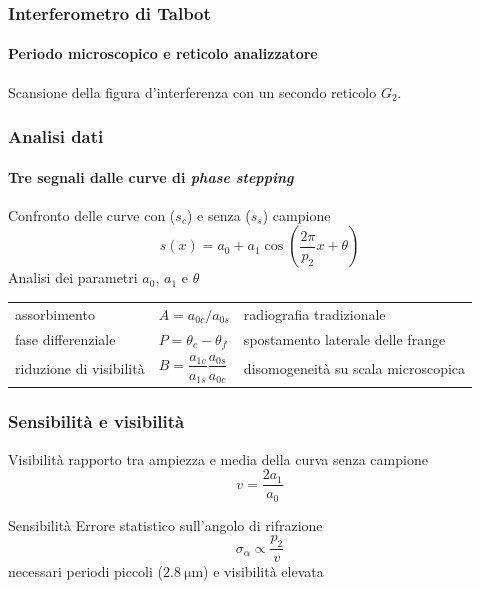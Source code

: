 \documentclass[italian]{beamer}
\newcommand{\G}[1]{\ensuremath{G_{#1}}}
\begin{document}
\begin{frame}
    \frametitle{Interferometro di Talbot}
    \framesubtitle{Periodo microscopico e reticolo analizzatore}
    Scansione della figura d'interferenza con un secondo reticolo \G{2}.
    \vspace{\baselineskip}\\
    \begin{figure}[h!]
        \centering
        \resizebox{.9\textwidth}{!}{}
    \end{figure}
\end{frame}

\begin{frame}
    \frametitle{Analisi dati}
    \framesubtitle{Tre segnali dalle curve di \emph{phase stepping}}
    Confronto delle curve con ($s_c$) e senza ($s_s$) campione
    \begin{equation*}
        s(x) = a_0 + a_1 \cos \left(\frac{2 \pi}{p_2} x + \theta\right)
    \end{equation*}
    Analisi dei parametri $a_0$, $a_1$ e $\theta$
    \vspace*{\fill}\\
    \begin{table}
        \centering
        \begin{tabular}{*3l}
        \alert{assorbimento} & $A = a_{0c} / a_{0s}$ & radiografia
        tradizionale\\
        \alert{fase differenziale} & $P = \theta_{c} - \theta_f$ &
        spostamento laterale delle frange\\
        \alert{riduzione di visibilit\`a} & $B =
            \dfrac{a_{1c}}{a_{1s}}\dfrac{a_{0s}}{a_{0c}}$ &
            disomogeneit\`a su scala microscopica\\
        \end{tabular}
    \end{table}
\end{frame}

\begin{frame}
    \frametitle{Sensibilit\`a e visibilit\`a}
    \begin{block}
        {Visibilit\`a}  
        rapporto tra ampiezza e media della curva senza campione
        \begin{equation*}
            v = \frac{2a_1}{a_0} 
        \end{equation*}
    \end{block}
    \begin{block}
        {Sensibilit\`a}
        Errore statistico sull'angolo di rifrazione
        \begin{equation*}
            \sigma_\alpha \propto \frac{p_2}{v}
        \end{equation*}
        necessari periodi piccoli ($\SI{2.8}{\micro\metre}$) e visibilit\`a elevata
    \end{block}
\end{frame}
\end{document}
